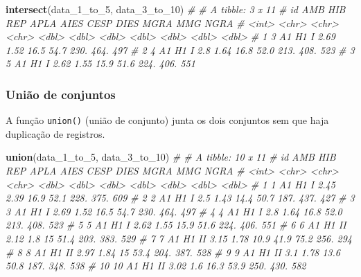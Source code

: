 \documentclass[
]{book}
\makeatletter
\newenvironment{Shaded}{\begin{snugshade}}{\end{snugshade}}
\newcommand{\CommentTok}[1]{\textcolor[rgb]{0.56,0.35,0.01}{\textit{#1}}}
\newcommand{\DecValTok}[1]{\textcolor[rgb]{0.00,0.00,0.81}{#1}}
\newcommand{\KeywordTok}[1]{\textcolor[rgb]{0.13,0.29,0.53}{\textbf{#1}}}
\newcommand{\NormalTok}[1]{#1}
\numberwithin{equation}{section}
\newcommand{\indf}[1]{\index[function]{#1@\texttt{#1()}|ST}}
\makeatother
\begin{document}
\begin{Shaded}
\begin{Highlighting}[]
\KeywordTok{intersect}\NormalTok{(data\_}\DecValTok{1}\NormalTok{\_to\_}\DecValTok{5}\NormalTok{, data\_}\DecValTok{3}\NormalTok{\_to\_}\DecValTok{10}\NormalTok{)}
\CommentTok{\# \# A tibble: 3 x 11}
\CommentTok{\#      id AMB   HIB   REP    APLA  AIES  CESP  DIES  MGRA   MMG  NGRA}
\CommentTok{\#   \textless{}int\textgreater{} \textless{}chr\textgreater{} \textless{}chr\textgreater{} \textless{}chr\textgreater{} \textless{}dbl\textgreater{} \textless{}dbl\textgreater{} \textless{}dbl\textgreater{} \textless{}dbl\textgreater{} \textless{}dbl\textgreater{} \textless{}dbl\textgreater{} \textless{}dbl\textgreater{}}
\CommentTok{\# 1     3 A1    H1    I      2.69  1.52  16.5  54.7  230.  464.   497}
\CommentTok{\# 2     4 A1    H1    I      2.8   1.64  16.8  52.0  213.  408.   523}
\CommentTok{\# 3     5 A1    H1    I      2.62  1.55  15.9  51.6  224.  406.   551}
\end{Highlighting}
\end{Shaded}

\hypertarget{uniuxe3o-de-conjuntos}{%
\subsubsection{União de conjuntos}\label{uniuxe3o-de-conjuntos}}

A função \texttt{union()}\indf{union} (união de conjunto) junta os dois conjuntos sem que haja duplicação de registros.

\begin{Shaded}
\begin{Highlighting}[]
\KeywordTok{union}\NormalTok{(data\_}\DecValTok{1}\NormalTok{\_to\_}\DecValTok{5}\NormalTok{, data\_}\DecValTok{3}\NormalTok{\_to\_}\DecValTok{10}\NormalTok{)}
\CommentTok{\# \# A tibble: 10 x 11}
\CommentTok{\#       id AMB   HIB   REP    APLA  AIES  CESP  DIES  MGRA   MMG  NGRA}
\CommentTok{\#    \textless{}int\textgreater{} \textless{}chr\textgreater{} \textless{}chr\textgreater{} \textless{}chr\textgreater{} \textless{}dbl\textgreater{} \textless{}dbl\textgreater{} \textless{}dbl\textgreater{} \textless{}dbl\textgreater{} \textless{}dbl\textgreater{} \textless{}dbl\textgreater{} \textless{}dbl\textgreater{}}
\CommentTok{\#  1     1 A1    H1    I      2.45  2.39  16.9  52.1 228.   375.   609}
\CommentTok{\#  2     2 A1    H1    I      2.5   1.43  14.4  50.7 187.   437.   427}
\CommentTok{\#  3     3 A1    H1    I      2.69  1.52  16.5  54.7 230.   464.   497}
\CommentTok{\#  4     4 A1    H1    I      2.8   1.64  16.8  52.0 213.   408.   523}
\CommentTok{\#  5     5 A1    H1    I      2.62  1.55  15.9  51.6 224.   406.   551}
\CommentTok{\#  6     6 A1    H1    II     2.12  1.8   15    51.4 203.   383.   529}
\CommentTok{\#  7     7 A1    H1    II     3.15  1.78  10.9  41.9  75.2  256.   294}
\CommentTok{\#  8     8 A1    H1    II     2.97  1.84  15    53.4 204.   387.   528}
\CommentTok{\#  9     9 A1    H1    II     3.1   1.78  13.6  50.8 187.   348.   538}
\CommentTok{\# 10    10 A1    H1    II     3.02  1.6   16.3  53.9 250.   430.   582}
\end{Highlighting}
\end{Shaded}
\end{document}
